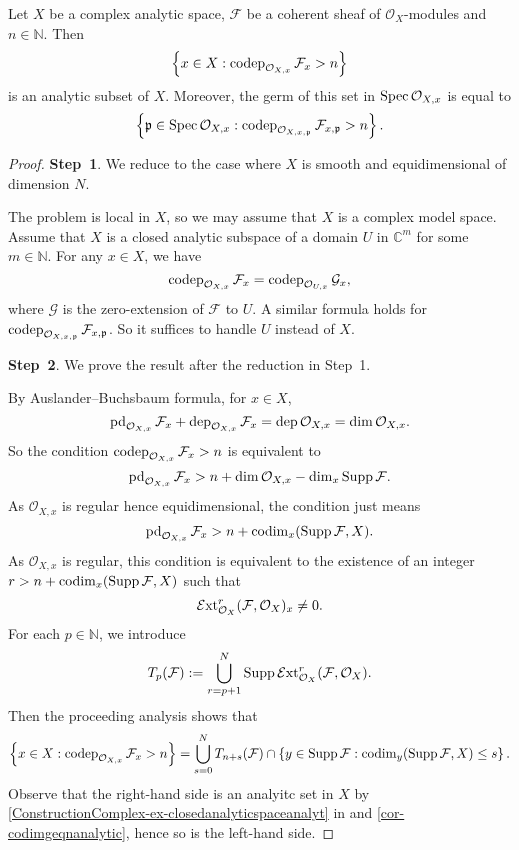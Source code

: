 \begin{proposition}\label{prop-coprofgnanal}
    Let $X$ be a complex analytic space, $\mathcal{F}$ be a coherent sheaf of $\mathcal{O}_X$-modules and $n\in \mathbb{N}$. Then 
    \[
        \left\{x\in X: \operatorname{codep}_{\mathcal{O}_{X,x}}\mathcal{F}_x> n \right\}
    \]
    is an analytic subset of $X$. Moreover, the germ of this set in $\operatorname{Spec} \mathcal{O}_{X,x}$ is equal to 
    \[
        \left\{\mathfrak{p}\in \operatorname{Spec} \mathcal{O}_{X,x}: \operatorname{codep}_{\mathcal{O}_{X,x,\mathfrak{p}}}\mathcal{F}_{x,\mathfrak{p}}> n \right\}. 
    \]
\end{proposition}
\begin{proof}
    \textbf{Step~1}. We reduce to the case where $X$ is smooth and equidimensional of dimension $N$.

    The problem is local in $X$, so we may assume that $X$ is a complex model space. Assume that $X$ is a closed analytic subspace of a domain $U$ in $\mathbb{C}^m$ for some $m\in \mathbb{N}$. For any $x\in X$, we have
    \[
        \operatorname{codep}_{\mathcal{O}_{X,x}}\mathcal{F}_x=\operatorname{codep}_{\mathcal{O}_{U,x}}\mathcal{G}_x,
    \]
    where $\mathcal{G}$ is the zero-extension of $\mathcal{F}$ to $U$. A similar formula holds for $\operatorname{codep}_{\mathcal{O}_{X,x,\mathfrak{p}}}\mathcal{F}_{x,\mathfrak{p}}$. So it suffices to handle $U$ instead of $X$.

    \textbf{Step~2}. We prove the result after the reduction in Step~1.

    By Auslander--Buchsbaum formula, for $x\in X$,
    \[
        \operatorname{pd}_{\mathcal{O}_{X,x}} \mathcal{F}_x+\operatorname{dep}_{\mathcal{O}_{X,x}} \mathcal{F}_x=\operatorname{dep} \mathcal{O}_{X,x}=\dim \mathcal{O}_{X,x}.
    \]
    So the condition $\operatorname{codep}_{\mathcal{O}_{X,x}} \mathcal{F}_x>n$ is equivalent to
    \[
        \operatorname{pd}_{\mathcal{O}_{X,x}} \mathcal{F}_x> n+\dim \mathcal{O}_{X,x}-\dim_x \operatorname{Supp}\mathcal{F}.
    \]
    As $\mathcal{O}_{X,x}$ is regular hence equidimensional, the condition just means
    \[
        \operatorname{pd}_{\mathcal{O}_{X,x}} \mathcal{F}_x> n+\operatorname{codim}_x(\operatorname{Supp} \mathcal{F}, X).
    \]
    As $\mathcal{O}_{X,x}$ is regular, this condition is equivalent to the existence of an integer $r>n+\operatorname{codim}_x(\operatorname{Supp} \mathcal{F}, X)$ such that
    \[
        \mathcal{E}\mathrm{xt}_{\mathcal{O}_X}^r(\mathcal{F},\mathcal{O}_X)_x\neq 0.  
    \]
    For each $p\in \mathbb{N}$, we introduce
    \[
        T_p(\mathcal{F}):=\bigcup_{r=p+1}^{N}\operatorname{Supp} \mathcal{E}\mathrm{xt}_{\mathcal{O}_X}^r(\mathcal{F},\mathcal{O}_X).  
    \]
    Then the proceeding analysis shows that 
    \[
        \left\{x\in X: \operatorname{codep}_{\mathcal{O}_{X,x}}\mathcal{F}_x> n \right\}=\bigcup_{s=0}^{N} T_{n+s}(\mathcal{F})\cap \left\{y\in \operatorname{Supp} \mathcal{F}:\operatorname{codim}_y(\operatorname{Supp} \mathcal{F},X)\leq s\right\}.
    \]
    Observe that the right-hand side is an analyitc set in $X$ by  \cref{ConstructionComplex-ex-closedanalyticspaceanalyt} in  and \cref{cor-codimgeqnanalytic}, hence so is the left-hand side.


\end{proof}
